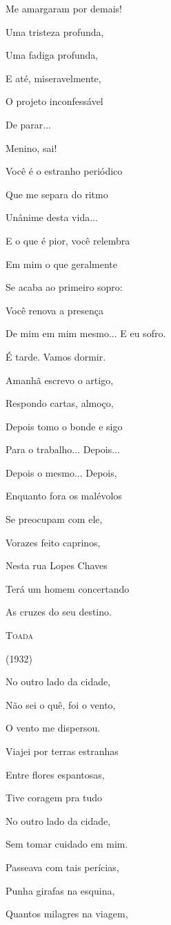 Me amargaram por demais!

Uma tristeza profunda,

Uma fadiga profunda,

E até, miseravelmente,

O projeto inconfessável

De parar...

Menino, sai!

Você é o estranho periódico

Que me separa do ritmo

Unânime desta vida...

E o que é pior, você relembra

Em mim o que geralmente

Se acaba ao primeiro sopro:

Você renova a presença

De mim em mim mesmo... E eu sofro.

É tarde. Vamos dormir.

Amanhã escrevo o artigo,

Respondo cartas, almoço,

Depois tomo o bonde e sigo

Para o trabalho... Depois...

Depois o mesmo... Depois,

Enquanto fora os malévolos

Se preocupam com ele,

Vorazes feito caprinos,

Nesta rua Lopes Chaves

Terá um homem concertando

As cruzes do seu destino.

\textsc{Toada}

(1932)

No outro lado da cidade,

Não sei o quê, foi o vento,

O vento me dispersou.

Viajei por terras estranhas

Entre flores espantosas,

Tive coragem pra tudo

No outro lado da cidade,

Sem tomar cuidado em mim.

Passeava com tais perícias,

Punha girafas na esquina,

Quantos milagres na viagem,

